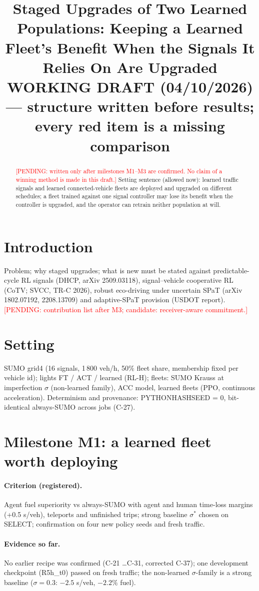 \documentclass[11pt]{article}
\title{Staged Upgrades of Two Learned Populations: Keeping a Learned Fleet's Benefit When the Signals It Relies On Are Upgraded\\[4pt]
\large WORKING DRAFT (04/10/2026) --- structure written before results; every red item is a missing comparison}
\date{}
\newcommand{\pending}[1]{\textcolor{red}{[PENDING: #1]}}
\begin{document}
\maketitle

\begin{abstract}
\pending{written only after milestones M1--M3 are confirmed. No claim of a winning method is made in this draft.}
Setting sentence (allowed now): learned traffic signals and learned connected-vehicle fleets are deployed and upgraded on different
schedules; a fleet trained against one signal controller may lose its benefit when the controller is upgraded, and the operator can
retrain neither population at will.
\end{abstract}

\section{Introduction}
Problem; why staged upgrades; what is new must be stated against predictable-cycle RL signals (DHCP, arXiv 2509.03118),
signal--vehicle cooperative RL (CoTV; SVCC, TR-C 2026), robust eco-driving under uncertain SPaT (arXiv 1802.07192, 2208.13709) and
adaptive-SPaT provision (USDOT report). \pending{contribution list after M3; candidate: receiver-aware commitment.}

\section{Setting}
SUMO grid4 (16 signals, 1\,800 veh/h, 50\% fleet share, membership fixed per vehicle id); lights FT / ACT / learned (RL-H);
fleets: SUMO Krauss at imperfection $\sigma$ (non-learned family), ACC model, learned fleets (PPO, continuous acceleration).
Determinism and provenance: PYTHONHASHSEED = 0, bit-identical always-SUMO across jobs (C-27).

\section{Milestone M1: a learned fleet worth deploying}
\paragraph{Criterion (registered).} Agent fuel superiority vs always-SUMO with agent and human time-loss margins (+0.5 s/veh),
teleports and unfinished trips; strong baseline $\sigma^*$ chosen on SELECT; confirmation on four new policy seeds and fresh traffic.
\paragraph{Evidence so far.} No earlier recipe was confirmed (C-21 \dots C-31, corrected C-37); one development checkpoint (R5h\_t0)
passed on fresh traffic; the non-learned $\sigma$-family is a strong baseline ($\sigma=0.3$: $-2.5$ s/veh, $-2.2\%$ fuel).
\end{document}
